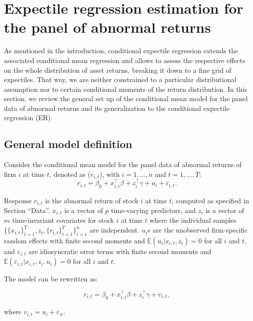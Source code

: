\documentclass[11pt]{article}
\begin{document}
\hypertarget{expectile-regression-for-the-panel-data-of-nasdaq-returns}{%
\section{Expectile regression estimation for the panel of abnormal returns}\label{expectile-regression-for-the-panel-data-of-nasdaq-returns}}

As mentioned in the introduction, conditional expectile regression extends the associated conditional mean regression and allows to assess the respective effects on the whole distribution of asset returns, breaking it down to a fine grid of expectiles. That way, we are neither constrained to a particular distributional assumption nor to certain conditional moments of the return distribution. In this section, we review the general set up of the conditional mean model for the panel data of abnormal returns and its generalization to the conditional expectile regression (ER).

\hypertarget{general-model-definition}{%
\subsection{General model definition}\label{general-model-definition}}

Consider the conditional mean model for the panel data of abnormal returns of firm \(i\) at time \(t\), denoted as (\(r_{i,t}\)), with \(i=1,\ldots,n\) and \(t=1,\ldots, T\):
\[r_{i,t} = \beta_0 + x_{i,t}^\top\beta + z_{i}^\top\gamma + u_{i} + \varepsilon_{i,t}.\]

Response \(r_{i,t}\) is the abnormal return of stock \(i\) at time \(t\), computed as specified in Section ``Data''. \(x_{i,t}\) is a vector of \(p\) time-varying predictors, and \(z_i\) is a vector of \(m\) time-invariant covariates for stock \(i\) at time \(t\) where the individual samples $\{\{x_{i,t}\}_{t=1}^T,z_i,\{r_{i,t}\}_{t=1}^T\}_{i=1}^n$ are independent. $u_i$s are the unobserved firm-specific random effects with finite second moments and $\mathbb E(u_i|x_{i,t},z_i)=0$ for all $i$ and $t$, and $\varepsilon_{i,t}$ are idiosyncratic error terms with finite second moments and $\mathbb E(\varepsilon_{i,t}|x_{i,t},z_i,u_i)=0$  for all $i$ and $t$.

The model can be rewritten as:

\[r_{i,t} = \beta_0 + x_{i,t}^\top\beta + z_{i}^\top\gamma+v_{i,t},\]

where \(v_{i,t} = u_{i} + \varepsilon_{it}\).
\end{document}

